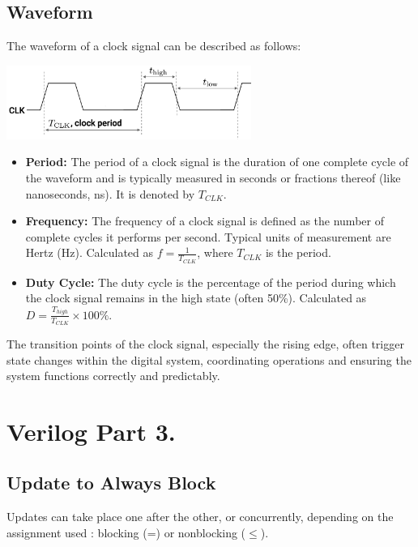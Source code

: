 \documentclass[12pt,openany]{book}
\begin{document}
\subsection{Waveform}
The waveform of a clock signal can be described as follows:
\begin{center}
	\includegraphics[width=0.6\textwidth]{circuits/12.3.2.png}
\end{center}
\justify
\begin{itemize}
    \item \textbf{Period:} The period of a clock signal is the duration of one complete cycle of the waveform and is typically measured in seconds or fractions thereof (like nanoseconds, ns). \newline It is denoted by $T_{CLK}$.
    \item \textbf{Frequency:} The frequency of a clock signal is defined as the number of complete cycles it performs per second. Typical units of measurement are Hertz (Hz). \newline Calculated as $f = \frac{1}{T_{CLK}}$, where $T_{CLK}$ is the period.
    \item \textbf{Duty Cycle:} The duty cycle is the percentage of the period during which the clock signal remains in the high state (often 50\%). Calculated as $D = \frac{T_{high}}{T_{CLK}} \times 100\%$.
\end{itemize}



\begin{justify}
	The transition points of the clock signal, especially the rising edge, often trigger state changes within the digital system, coordinating operations and ensuring the system functions correctly and predictably.
\end{justify}

\section{Verilog Part 3.}
\subsection{Update to Always Block}
Updates can take place one after the other, or concurrently, depending on the assignment used : blocking (=) or nonblocking ($\leq$). \newline
\vspace*{-20px}
\end{document}
